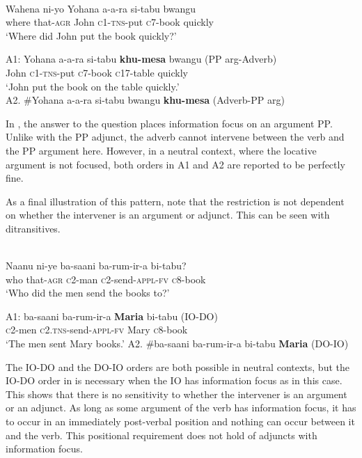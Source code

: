 \documentclass[output=paper]{langsci/langscibook}
\begin{document}
\ea\label{ex:}
\\
\gll Wahena  ni-yo    Yohana   a-a-ra     si-tabu          bwangu \\
      where     that-\textsc{agr}   John     \textsc{c1-tns}-put   \textsc{c}7-book       quickly\\
\glt ‘Where did John put the book quickly?’  
\z


\ea\label{ex:}
\gll A1:  Yohana    a-a-ra  si-tabu    \textbf{{khu-mesa}}  bwangu     (PP arg-Adverb) \\
       John       \textsc{c1-tns-}put  \textsc{c}7-book   \textsc{c}17-table   quickly\\
\glt   ‘John put the book on the table quickly.’   \\ 
 A2.  \#Yohana   a-a-ra   si-tabu      bwangu   \textbf{khu-mesa}         (Adverb-PP arg)\\
\z
 


In , the answer to the question places information focus on an argument PP. Unlike with the PP adjunct, the adverb cannot intervene between the verb and the PP argument here. However, in a neutral context, where the locative argument is not focused, both orders in A1 and A2 are reported to be perfectly fine.

As a final illustration of this pattern, note that the restriction is not dependent on whether the intervener is an argument or adjunct. This can be seen with ditransitives. 


\ea\label{ex:}
\\
\gll   Naanu    ni-ye    ba-saani   ba-rum-ir-a     bi-tabu?\\
     who     that-\textsc{agr}   \textsc{c}2-man   \textsc{c}2-send-\textsc{appl-fv}   \textsc{c}8-book\\
\glt ‘Who did the men send the books to?’
\z




\ea\label{ex:}
\gll A1:  ba-saani   ba-rum-ir-a    \textbf{{Maria}}     bi-tabu       (IO-DO) \\
       \textsc{c}2-men   \textsc{c2.tns}-send-\textsc{appl-fv}   Mary      \textsc{c}8-book  \\
\glt    ‘The men sent Mary books.’
 A2.  \#ba-saani  ba-rum-ir-a      bi-tabu   \textbf{Maria}  (DO-IO) \\
\z

The IO-DO and the DO-IO orders are both possible in neutral contexts, but the IO-DO order in  is necessary when the IO has information focus as in this case. This shows that there is no sensitivity to whether the intervener is an argument or an adjunct. As long as some argument of the verb has information focus, it has to occur in an immediately post-verbal position and nothing can occur between it and the verb. This positional requirement does not hold of adjuncts with information focus.
\end{document}

